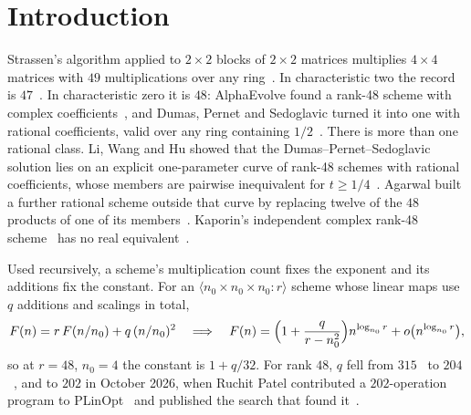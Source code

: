 \documentclass[11pt]{article}
\theoremstyle{remark}
\begin{document}
\section{Introduction}

Strassen's algorithm applied to $2\times2$ blocks of $2\times2$
matrices multiplies $4\times4$ matrices with $49$ multiplications over
any ring~\cite{Strassen69}.  In characteristic two the record is
$47$~\cite{Fawzi22,KM23}.  In characteristic zero it is $48$: AlphaEvolve
found a rank-48 scheme with complex coefficients~\cite{Novikov25}, and
Dumas, Pernet and Sedoglavic turned it into one with rational
coefficients, valid over any ring containing $1/2$~\cite{DPS25,DPS26a}.
There is more than one rational class.  Li, Wang and Hu showed that the
Dumas--Pernet--Sedoglavic solution lies on an explicit one-parameter
curve of rank-48 schemes with rational coefficients, whose members are
pairwise inequivalent for $t\ge1/4$~\cite{LWH26}.  Agarwal built a
further rational scheme outside that curve by replacing twelve of the
$48$ products of one of its members~\cite{Agarwal26}.  Kaporin's
independent complex rank-48 scheme~\cite{Kaporin24} has no real
equivalent~\cite{MSY26}.

Used recursively, a scheme's multiplication count fixes the exponent and
its additions fix the constant.  For an
$\langle n_0\times n_0\times n_0:r\rangle$ scheme whose linear maps use
$q$ additions and scalings in total,
\[
F(n) = r\,F(n/n_0) + q\,(n/n_0)^2
\quad\Longrightarrow\quad
F(n) = \Bigl(1+\frac{q}{r-n_0^2}\Bigr)n^{\log_{n_0} r} + o\bigl(n^{\log_{n_0} r}\bigr),
\]
so at $r=48$, $n_0=4$ the constant is $1+q/32$.  For rank $48$, $q$
fell from $315$~\cite{DPS25,PLinOpt} to $204$~\cite{DPSST26}, and to
$202$ in October 2026, when
Ruchit Patel contributed a $202$-operation program to
PLinOpt~\cite{PLinOpt} and published the search that found
it~\cite{Patel26}.
\end{document}
